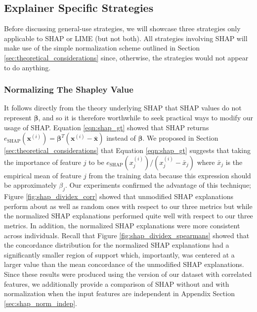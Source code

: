 \documentclass[mnsc,blindrev]{informs3}
\begin{document}
    \subsection{Explainer Specific Strategies}
        Before discussing general-use strategies, we will showcase three strategies only applicable to SHAP or LIME (but not both). All strategies involving SHAP will make use of the simple normalization scheme outlined in Section \ref{sec:theoretical_considerations} since, otherwise, the strategies would not appear to do anything.


            \subsubsection{Normalizing The Shapley Value}
                It follows directly from the theory underlying SHAP that SHAP values do not represent $\boldsymbol{\beta}$, and so it is therefore worthwhile to seek practical ways to modify our usage of SHAP. Equation \ref{eqn:shap_gt} showed that SHAP returns $e_{\text{SHAP}}(\mathbf{x}^{(i)})=\boldsymbol{\beta}^T(\mathbf{x}^{(i)} - \bar{\mathbf{x}})$ instead of $\boldsymbol{\beta}$. We proposed in Section \ref{sec:theoretical_considerations} that Equation \ref{eqn:shap_gt} suggests that taking the importance of feature $j$ to be $e_{\text{SHAP}}(x^{(i)}_j) / (x^{(i)}_j - \bar{x}_j)$ where $\bar{x}_j$ is the empirical mean of feature $j$ from the training data because this expression should be approximately $\beta_j$. Our experiments confirmed the advantage of this technique; Figure \ref{fig:shap_dividex_corr} showed that unmodified SHAP explanations perform about as well as random ones with respect to our three metrics but while the normalized SHAP explanations performed quite well with respect to our three metrics. In addition, the normalized SHAP explanations were more consistent across individuals. Recall that Figure \ref{fig:shap_dividex_spearmans} showed that the concordance distribution for the normalized SHAP explanations had a significantly smaller region of support which, importantly, was centered at a larger value than the mean concordance of the unmodified SHAP explanations. Since these results were produced using the version of our dataset with correlated features, we additionally provide a comparison of SHAP without and with normalization when the input features are independent in Appendix Section \ref{sec:shap_norm_indep}.



        
\end{document}
